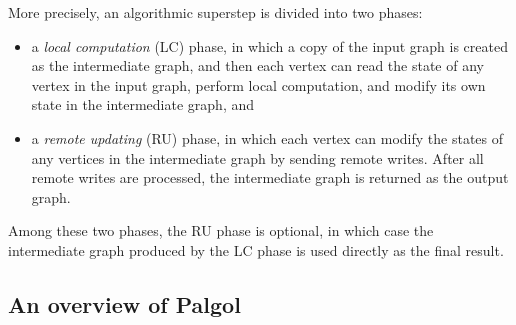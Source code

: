 \documentclass{sokendai_thesis} %
\begin{document}
More precisely, an algorithmic superstep is divided into two phases:
\begin{itemize}
 \item a \emph{local computation} (LC) phase, in which a copy of the input graph is created as the intermediate graph, and then each vertex can read the state of any vertex in the input graph, perform local computation, and modify its own state in the intermediate graph, and
 \item a \emph{remote updating} (RU) phase, in which each vertex can modify the states of any vertices in the intermediate graph by sending remote writes.
After all remote writes are processed, the intermediate graph is returned as the output graph.
\end{itemize}
Among these two phases, the RU phase is optional, in which case the intermediate graph produced by the LC phase is used directly as the final result.

\subsection{An overview of Palgol}
\end{document}
